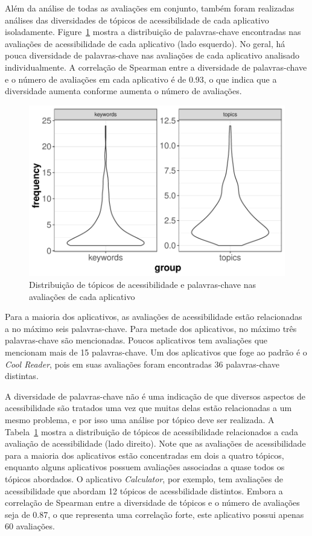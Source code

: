 Além da análise de todas as avaliações em conjunto, também foram realizadas análises das diversidades de tópicos de acessibilidade de cada aplicativo isoladamente. 
Figure~\ref{fig:distributiontopicsapps} mostra a distribuição de palavras-chave encontradas nas avaliações de acessibilidade de cada aplicativo (lado esquerdo). 
No geral, há pouca diversidade de palavras-chave nas avaliações de cada aplicativo analisado individualmente. 
A correlação de Spearman entre a diversidade de palavras-chave e o número de avaliações em cada aplicativo é de 0.93, o que indica que a diversidade aumenta conforme aumenta o número de avaliações.


 \begin{figure}[!htb]
 \centering
\includegraphics[scale=0.8]{imagens/distribution-topics-keywords.pdf}
\caption{Distribuição de tópicos de acessibilidade e palavras-chave nas avaliações de cada aplicativo}
\label{fig:distributiontopicsapps}
\end{figure}


Para a maioria dos aplicativos, as avaliações de acessibilidade estão relacionadas a no máximo seis palavras-chave. 
Para metade dos aplicativos, no máximo três palavras-chave são mencionadas. 
Poucos aplicativos tem avaliações que mencionam mais de 15 palavras-chave. 
Um dos aplicativos que foge ao padrão é o \textit{Cool Reader}, pois em suas avaliações foram encontradas 36 palavras-chave distintas. 


A diversidade de palavras-chave não é uma indicação de que diversos aspectos de acessibilidade são tratados uma vez que muitas delas estão relacionadas a um mesmo problema, e por isso uma análise por tópico deve ser realizada. 
A Tabela~\ref{fig:distributiontopicsapps} mostra a distribuição de tópicos de acessibilidade relacionados a cada avaliação de acessibilidade (lado direito). 
Note que as avaliações de acessibilidade para a maioria dos aplicativos estão concentradas em dois a quatro tópicos, enquanto alguns aplicativos possuem avaliações associadas a quase todos os tópicos abordados. 
O aplicativo \textit{Calculator}, por exemplo, tem avaliações de acessibilidade que abordam 12 tópicos de acessbilidade distintos. 
Embora a correlação de Spearman entre a diversidade de tópicos e o número de avaliações seja de 0.87, o que representa uma correlação forte, este aplicativo possui apenas 60 avaliações.


